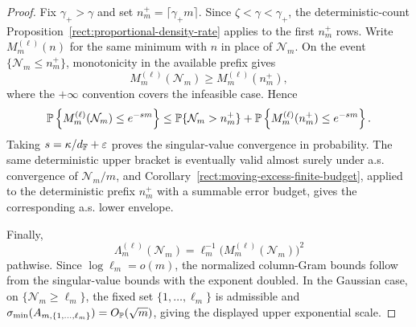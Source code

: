 \begin{proof}
Fix \(\gamma_+>\gamma\) and set \(n_m^+=\lceil\gamma_+m\rceil\).  Since
\(\zeta<\gamma<\gamma_+\), the deterministic-count
Proposition~\ref{rect:proportional-density-rate} applies to the first
\(n_m^+\) rows.  Write \(M_m^{(\ell)}(n)\) for the same minimum with
\(n\) in place of \(\mathcal N_m\).  On the event
\(\{\mathcal N_m\le n_m^+\}\), monotonicity in the
available prefix gives
\[
  M_m^{(\ell)}(\mathcal N_m)\ge M_m^{(\ell)}(n_m^+),
\]
where the \(+\infty\) convention covers the infeasible case.  Hence
\[
  \mathbb{P}\left\{M_m^{(\ell)}(\mathcal N_m)\le e^{-sm}\right\}
  \le
  \mathbb{P}\{\mathcal N_m>n_m^+\}
  +
  \mathbb{P}\left\{M_m^{(\ell)}(n_m^+)\le e^{-sm}\right\}.
\]
Taking \(s=\kappa/d_{\mathbb{F}}+\varepsilon\) proves the singular-value convergence in
probability.  The same deterministic upper bracket is eventually valid almost
surely under a.s. convergence of \(\mathcal N_m/m\), and
Corollary~\ref{rect:moving-excess-finite-budget}, applied to the deterministic
prefix \(n_m^+\) with a summable error budget, gives the corresponding a.s.
lower envelope.

Finally,
\[
  \Lambda_m^{(\ell)}(\mathcal N_m)
  =
  \ell_m^{-1}\bigl(M_m^{(\ell)}(\mathcal N_m)\bigr)^2
\]
pathwise.  Since \(\log\ell_m=o(m)\), the normalized column-Gram bounds follow
from the singular-value bounds with the exponent doubled.  In the Gaussian
case, on \(\{\mathcal N_m\ge\ell_m\}\), the fixed set
\(\{1,\ldots,\ell_m\}\) is admissible and
\(\sigma_{\min}(A_{m,\{1,\ldots,\ell_m\}})=O_{\mathbb{P}}(\sqrt m)\), giving the displayed
upper exponential scale.
\end{proof}


